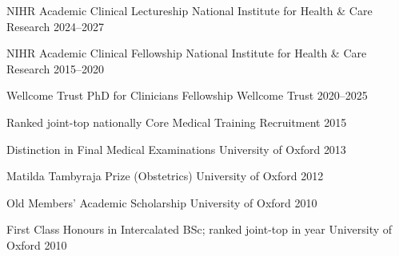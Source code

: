 
\begin{cvhonors}

  \cvhonor
    {NIHR Academic Clinical Lectureship} %
    {National Institute for Health \& Care Research} %
    {} %
    {2024–2027} %

  \cvhonor
    {NIHR Academic Clinical Fellowship} %
    {National Institute for Health \& Care Research} %
    {} %
    {2015–2020} %

  \cvhonor
    {Wellcome Trust PhD for Clinicians Fellowship} %
    {Wellcome Trust} %
    {} %
    {2020–2025} %

\end{cvhonors}

\begin{cvhonors}

  \cvhonor
    {Ranked joint-top nationally} %
    {Core Medical Training Recruitment} %
    {} %
    {2015} %

  \cvhonor
    {Distinction in Final Medical Examinations} %
    {University of Oxford} %
    {} %
    {2013} %

  \cvhonor
    {Matilda Tambyraja Prize (Obstetrics)} %
    {University of Oxford} %
    {} %
    {2012} %

  \cvhonor
    {Old Members' Academic Scholarship} %
    {University of Oxford} %
    {} %
    {2010} %

  \cvhonor
    {First Class Honours in Intercalated BSc; ranked joint-top in year} %
    {University of Oxford} %
    {} %
    {2010} %


\end{cvhonors}

